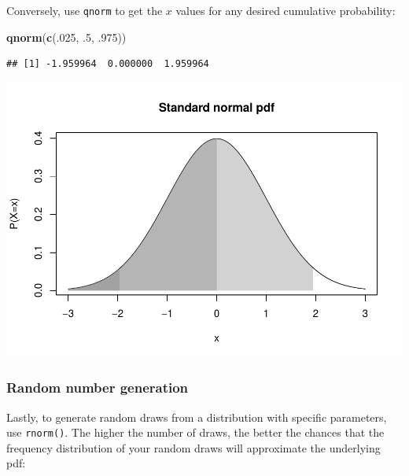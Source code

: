 \documentclass[
  11pt,
]{article}
\newenvironment{Shaded}{\begin{snugshade}}{\end{snugshade}}
\newcommand{\DecValTok}[1]{\textcolor[rgb]{0.00,0.00,0.81}{#1}}
\newcommand{\FunctionTok}[1]{\textcolor[rgb]{0.13,0.29,0.53}{\textbf{#1}}}
\newcommand{\NormalTok}[1]{#1}
\begin{document}
Conversely, use \texttt{qnorm} to get the \(x\) values for any desired cumulative probability:

\begin{Shaded}
\begin{Highlighting}[]
\FunctionTok{qnorm}\NormalTok{(}\FunctionTok{c}\NormalTok{(.}\DecValTok{025}\NormalTok{, .}\DecValTok{5}\NormalTok{, .}\DecValTok{975}\NormalTok{))}
\end{Highlighting}
\end{Shaded}

\begin{verbatim}
## [1] -1.959964  0.000000  1.959964
\end{verbatim}

\begin{center}\includegraphics{01-01-lec_files/figure-latex/stdnorm-7-1} \end{center}

\hypertarget{random-number-generation}{%
\subsubsection{Random number generation}\label{random-number-generation}}

Lastly, to generate random draws from a distribution with specific parameters, use \texttt{rnorm()}. The higher the number of draws, the better the chances that the frequency distribution of your random draws will approximate the underlying pdf:
\end{document}
